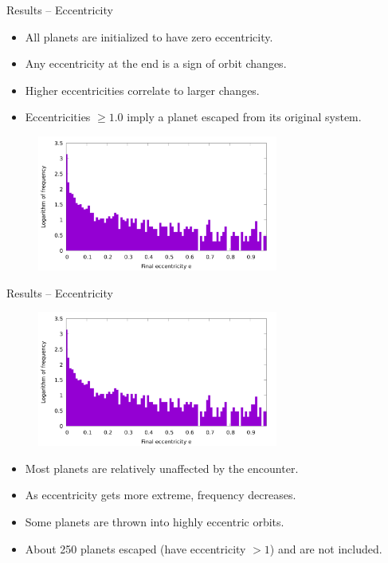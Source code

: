 \documentclass{beamer}
\begin{document}
\begin{frame}{Results -- Eccentricity}
    \begin{itemize}
        \item All planets are initialized to have zero eccentricity.
        \item Any eccentricity at the end is a sign of orbit changes.
        \item Higher eccentricities correlate to larger changes.
        \item Eccentricities $\ge 1.0$ imply a planet escaped from its
            original system.
    \end{itemize}
    \begin{figure}
        \centering
        \includegraphics[height=1.75in]{eccentricity_final}
    \end{figure}
\end{frame}

\begin{frame}{Results -- Eccentricity}
    \begin{figure}
        \centering
        \includegraphics[height=1.75in]{eccentricity_final}
    \end{figure}
    \begin{itemize}
        \item Most planets are relatively unaffected by the encounter.
        \item As eccentricity gets more extreme, frequency decreases.
        \item Some planets are thrown into highly eccentric orbits.
        \item About 250 planets escaped (have eccentricity $> 1$) and are not included.
    \end{itemize}
\end{frame}
\end{document}

